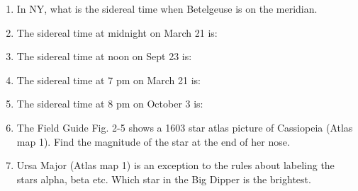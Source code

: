 \begin{enumerate}
\item
In NY, what is the sidereal time when Betelgeuse is on the meridian.

\item
The sidereal time at midnight on March 21 is:

\item
The sidereal time at noon on Sept 23 is:

\item
The sidereal time at 7 pm  on March 21 is:

\item
The sidereal time at 8 pm on October 3 is:
   
\item
The Field Guide Fig. 2-5 shows a 1603 star atlas picture of Cassiopeia
(Atlas map 1). Find the
magnitude of the star at the end of her nose.

\item
Ursa Major (Atlas map 1) is an exception to the rules about labeling the stars
alpha, beta etc.  Which star in the Big Dipper is the brightest.



\end{enumerate} 














